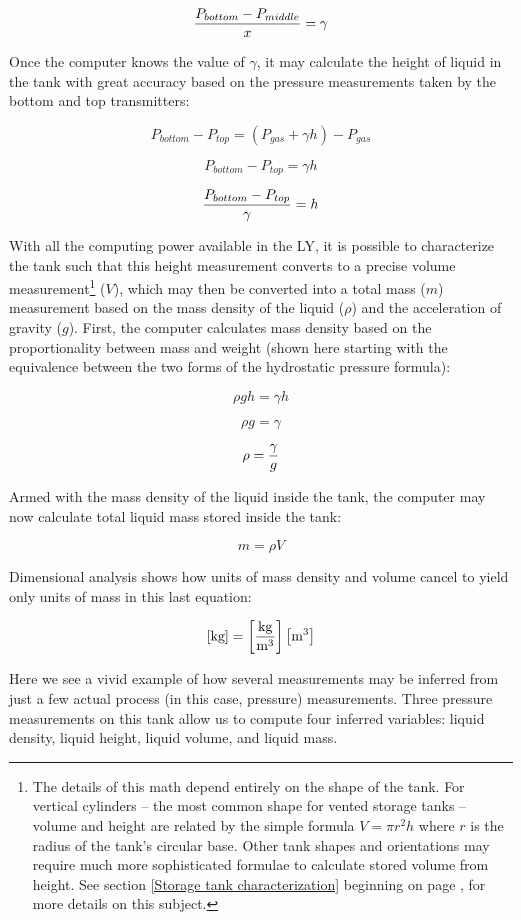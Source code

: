 $${{P_{bottom} - P_{middle}} \over x} = \gamma $$

Once the computer knows the value of $\gamma$, it may calculate the height of liquid in the tank with great accuracy based on the pressure measurements taken by the bottom and top transmitters:

$$P_{bottom} - P_{top} = (P_{gas} + \gamma h) - P_{gas}$$

$$P_{bottom} - P_{top} = \gamma h$$

$${{P_{bottom} - P_{top}} \over \gamma} = h$$

With all the computing power available in the LY, it is possible to characterize the tank such that this height measurement converts to a precise volume measurement\footnote{The details of this math depend entirely on the shape of the tank.  For vertical cylinders -- the most common shape for vented storage tanks -- volume and height are related by the simple formula $V = \pi r^2 h$ where $r$ is the radius of the tank's circular base.  Other tank shapes and orientations may require much more sophisticated formulae to calculate stored volume from height.  See section \ref{Storage tank characterization} beginning on page \pageref{Storage tank characterization}, for more details on this subject.} ($V$), which may then be converted into a total mass ($m$) measurement based on the mass density of the liquid ($\rho$) and the acceleration of gravity ($g$).  First, the computer calculates mass density based on the proportionality between mass and weight (shown here starting with the equivalence between the two forms of the hydrostatic pressure formula):

$$\rho g h = \gamma h$$

$$\rho g = \gamma$$

$$\rho = {\gamma \over g}$$

\filbreak

Armed with the mass density of the liquid inside the tank, the computer may now calculate total liquid mass stored inside the tank:

$$m = \rho V$$

Dimensional analysis shows how units of mass density and volume cancel to yield only units of mass in this last equation:

$$\left[\hbox{kg}\right] = \left[\hbox{kg} \over \hbox{m}^3\right] \left[\hbox{m}^3\right]$$

Here we see a vivid example of how several measurements may be inferred from just a few actual process (in this case, pressure) measurements.  Three pressure measurements on this tank allow us to compute four inferred variables: liquid density, liquid height, liquid volume, and liquid mass. 

